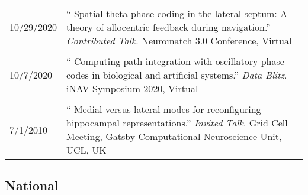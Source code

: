 \documentclass[10pt]{article}
\newcommand{\itemtitle}[1]{{\color{hopkinsblue}\ul{#1}}}
\newcommand{\unpubtitle}[1]{{\color{hopkinsblue} #1}}
\begin{document}
\begin{longtable}{@{\hspace{0.0in}}l>{\raggedright\arraybackslash}p{}}
  10/29/2020 & ``\unpubtitle{Spatial theta-phase coding in
  the lateral septum: A theory of allocentric feedback during navigation}.''
  \emph{Contributed Talk}. Neuromatch 3.0 Conference, Virtual \\
  \tabularnewline
  10/7/2020 & ``\unpubtitle{Computing path integration with
  oscillatory phase codes in biological and artificial systems}.'' \emph{Data
  Blitz}. iNAV Symposium 2020, Virtual \\
  \tabularnewline
  7/1/2010 & ``\unpubtitle{Medial versus lateral modes for
  reconfiguring hippocampal representations}.'' \emph{Invited Talk}. Grid
  Cell Meeting, Gatsby Computational Neuroscience Unit, UCL, UK \\
\end{longtable}


\subsection*{National}
\label{sec:natltalks}
\end{document}
